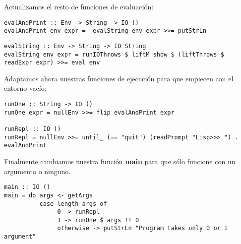 Actualizamos el resto de funciones de evaluaci\'on:\\

\begin{minipage}{\linewidth}
\begin{footnotesize}
\begin{lstlisting}[frame=single]
evalAndPrint :: Env -> String -> IO ()
evalAndPrint env expr =  evalString env expr >>= putStrLn
\end{lstlisting}
\end{footnotesize}
\end{minipage}

\begin{minipage}{\linewidth}
\begin{tiny}
\begin{lstlisting}[frame=single]
evalString :: Env -> String -> IO String
evalString env expr = runIOThrows $ liftM show $ (liftThrows $ readExpr expr) >>= eval env
\end{lstlisting}
\end{tiny}
\end{minipage}

Adaptamos ahora nuestras funciones de ejecuci\'on para que empiecen con el entorno vac\'io:\\

\begin{minipage}{\linewidth}
\begin{scriptsize}
\begin{lstlisting}[frame=single]
runOne :: String -> IO ()
runOne expr = nullEnv >>= flip evalAndPrint expr

runRepl :: IO ()
runRepl = nullEnv >>= until_ (== "quit") (readPrompt "Lisp>>> ") . evalAndPrint
\end{lstlisting}
\end{scriptsize}
\end{minipage}

Finalmente cambiamos nuestra funci\'on \textbf{main} para que s\'olo funcione con un argumento o ninguno.\\

\begin{minipage}{\linewidth}
\begin{scriptsize}
\begin{lstlisting}[frame=single]
main :: IO ()
main = do args <- getArgs
          case length args of
               0 -> runRepl
               1 -> runOne $ args !! 0
               otherwise -> putStrLn "Program takes only 0 or 1 argument"
\end{lstlisting}
\end{scriptsize}
\end{minipage}